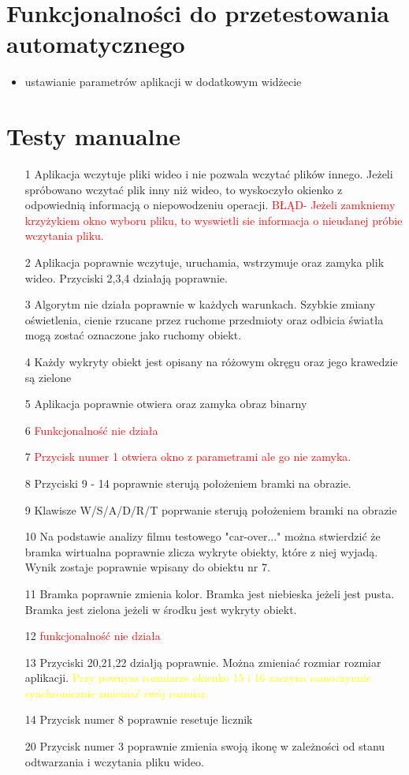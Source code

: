 \documentclass[11pt,a4paper]{article}
\begin{document}
\section{Funkcjonalności do przetestowania automatycznego}
\begin{itemize}
\item ustawianie parametrów aplikacji w dodatkowym widżecie
\end{itemize}

\section{Testy manualne}
\begin{enumerate}
\item[1] Aplikacja wczytuje pliki wideo i nie pozwala wczytać plików innego. Jeżeli spróbowano wczytać plik inny niż wideo, to wyskoczyło okienko z odpowiednią informacją o niepowodzeniu operacji.  \textcolor{red}{BŁĄD- Jeżeli zamkniemy krzyżykiem okno wyboru pliku, to wyswietli  sie informacja o nieudanej próbie wczytania pliku.}
\item[2] Aplikacja poprawnie wczytuje, uruchamia, wstrzymuje oraz zamyka plik wideo. Przyciski 2,3,4 działają poprawnie.
\item[3] Algorytm nie działa poprawnie w każdych warunkach. Szybkie zmiany oświetlenia, cienie  rzucane przez ruchome przedmioty oraz odbicia światła mogą zostać oznaczone jako ruchomy obiekt. 
\item[4] Każdy  wykryty obiekt jest opisany na różowym okręgu oraz jego krawedzie są zielone
\item[5]  Aplikacja poprawnie otwiera oraz zamyka obraz binarny
\item[6]  \textcolor{red}{Funkcjonalność nie działa}
\item[7] \textcolor{red}{ Przycisk numer 1 otwiera okno z parametrami ale go nie zamyka.}
\item[8] Przyciski 9 - 14 poprawnie sterują położeniem bramki na obrazie.
\item[9] Klawisze W/S/A/D/R/T poprwanie sterują położeniem bramki na obrazie
\item[10] Na podstawie analizy filmu testowego "car-over..." można stwierdzić że bramka wirtualna poprawnie zlicza wykryte obiekty, które z niej wyjadą. Wynik zostaje poprawnie wpisany do obiektu nr 7.
\item[11] Bramka poprawnie zmienia kolor. Bramka jest niebieska jeżeli jest pusta. Bramka jest zielona jeżeli w środku jest wykryty obiekt.
\item[12] \textcolor{red}{funkcjonalność nie działa}
\item[13] Przyciski 20,21,22 działją poprawnie. Można zmieniać rozmiar rozmiar aplikacji. \textcolor{yellow}{Przy pewnym rozmiarze okienko 15 i 16 zaczyna samoczynnie synchronicznie zmieniać swój rozmiar.}
\item[14] Przycisk numer 8 poprawnie resetuje licznik
\item[20] Przycisk numer 3 poprawnie zmienia swoją ikonę w zależności od stanu odtwarzania i wczytania pliku wideo.


\end{enumerate}
\end{document}
